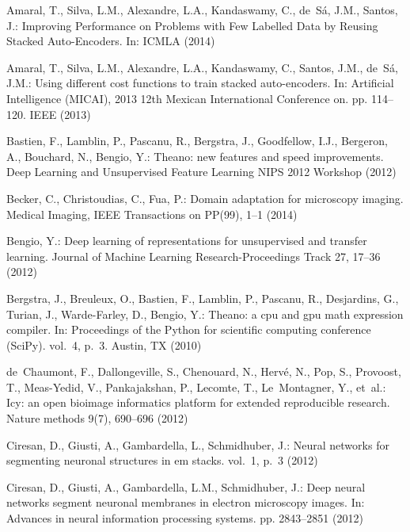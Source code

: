 \documentclass[a4paper,11pt]{article}
\newcommand{\1}{\mathbbm{1}}
\theoremstyle{plain}
\begin{document}
\begin{thebibliography}{10}
\providecommand{\url}[1]{\texttt{#1}}
\providecommand{\urlprefix}{URL }

Amaral, T., Silva, L.M., Alexandre, L.A., Kandaswamy, C., de~S\'{a}, J.M.,
  Santos, J.: {Improving Performance on Problems with Few Labelled Data by
  Reusing Stacked Auto-Encoders}. In: ICMLA (2014)

Amaral, T., Silva, L.M., Alexandre, L.A., Kandaswamy, C., Santos, J.M.,
  de~S{\'a}, J.M.: Using different cost functions to train stacked
  auto-encoders. In: Artificial Intelligence (MICAI), 2013 12th Mexican
  International Conference on. pp. 114--120. IEEE (2013)

Bastien, F., Lamblin, P., Pascanu, R., Bergstra, J., Goodfellow, I.J.,
  Bergeron, A., Bouchard, N., Bengio, Y.: Theano: new features and speed
  improvements. Deep Learning and Unsupervised Feature Learning NIPS 2012
  Workshop (2012)

Becker, C., Christoudias, C., Fua, P.: Domain adaptation for microscopy
  imaging. Medical Imaging, IEEE Transactions on  PP(99),  1--1 (2014)

Bengio, Y.: Deep learning of representations for unsupervised and transfer
  learning. Journal of Machine Learning Research-Proceedings Track  27,  17--36
  (2012)

Bergstra, J., Breuleux, O., Bastien, F., Lamblin, P., Pascanu, R., Desjardins,
  G., Turian, J., Warde-Farley, D., Bengio, Y.: Theano: a cpu and gpu math
  expression compiler. In: Proceedings of the Python for scientific computing
  conference (SciPy). vol.~4, p.~3. Austin, TX (2010)

de~Chaumont, F., Dallongeville, S., Chenouard, N., Herv{\'e}, N., Pop, S.,
  Provoost, T., Meas-Yedid, V., Pankajakshan, P., Lecomte, T., Le~Montagner,
  Y., et~al.: Icy: an open bioimage informatics platform for extended
  reproducible research. Nature methods  9(7),  690--696 (2012)

Ciresan, D., Giusti, A., Gambardella, L., Schmidhuber, J.: Neural networks for
  segmenting neuronal structures in em stacks. vol.~1, p.~3 (2012)

Ciresan, D., Giusti, A., Gambardella, L.M., Schmidhuber, J.: Deep neural
  networks segment neuronal membranes in electron microscopy images. In:
  Advances in neural information processing systems. pp. 2843--2851 (2012)


\end{thebibliography}
\end{document}

